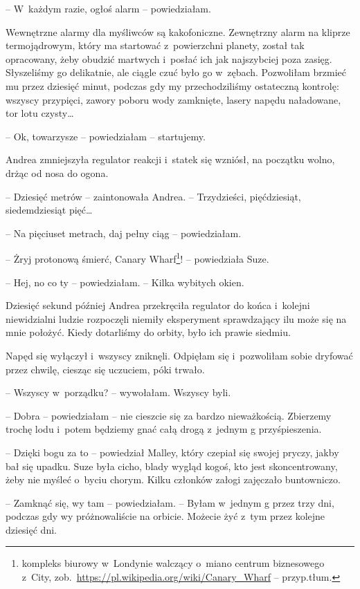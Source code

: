 \documentclass[oneside,polish,11pt,sfheadings]{mwbk}
\begin{document}
-- W~każdym razie, ogłoś alarm -- powiedziałam.

Wewnętrzne alarmy dla myśliwców są kakofoniczne. Zewnętrzny alarm na
kliprze termojądrowym, który ma startować z~powierzchni planety, został
tak opracowany, żeby obudzić martwych i~posłać ich jak najszybciej poza
zasięg. Słyszeliśmy go delikatnie, ale ciągle czuć było go w~zębach.
Pozwoliłam brzmieć mu przez dziesięć minut, podczas gdy my
przechodziliśmy ostateczną kontrolę: wszyscy przypięci, zawory poboru
wody zamknięte, lasery napędu naładowane, tor lotu czysty\ldots 

-- Ok, towarzysze -- powiedziałam -- startujemy.

Andrea zmniejszyła regulator reakcji i~statek się wzniósł, na początku
wolno, drżąc od nosa do ogona.

-- Dziesięć metrów -- zaintonowała Andrea. -- Trzydzieści, pięćdziesiąt,
siedemdziesiąt pięć\ldots 

-- Na pięciuset metrach, daj pełny ciąg -- powiedziałam.

-- Żryj protonową śmierć, Canary Wharf\footnote{kompleks biurowy w~Londynie
walczący o~miano centrum biznesowego z~City,
zob.~\url{https://pl.wikipedia.org/wiki/Canary\_Wharf} -- przyp.tłum.}! -- powiedziała Suze.

-- Hej, no co ty -- powiedziałam. -- Kilka wybitych okien.

Dziesięć sekund później Andrea przekręciła regulator do końca i~kolejni
niewidzialni ludzie rozpoczęli niemiły eksperyment sprawdzający ilu może
się na mnie położyć. Kiedy dotarliśmy do orbity, było ich prawie
siedmiu.

Napęd się wyłączył i~wszyscy zniknęli. Odpięłam się i~pozwoliłam sobie
dryfować przez chwilę, ciesząc się uczuciem, póki trwało. 

-- Wszyscy w~porządku? -- wywołałam. Wszyscy byli.

-- Dobra -- powiedziałam -- nie cieszcie się za bardzo nieważkością.
Zbierzemy trochę lodu i~potem będziemy gnać całą drogą z~jednym g
przyśpieszenia.

-- Dzięki bogu za to -- powiedział Malley, który czepiał się swojej
pryczy, jakby bał się upadku. Suze była cicho, blady wygląd kogoś, kto
jest skoncentrowany, żeby nie myśleć o~byciu chorym. Kilku członków
załogi zajęczało buntowniczo.

-- Zamknąć się, wy tam -- powiedziałam. -- Byłam w~jednym g przez trzy dni,
podczas gdy wy próżnowaliście na orbicie. Możecie żyć z~tym przez
kolejne dziesięć dni.
\end{document}
